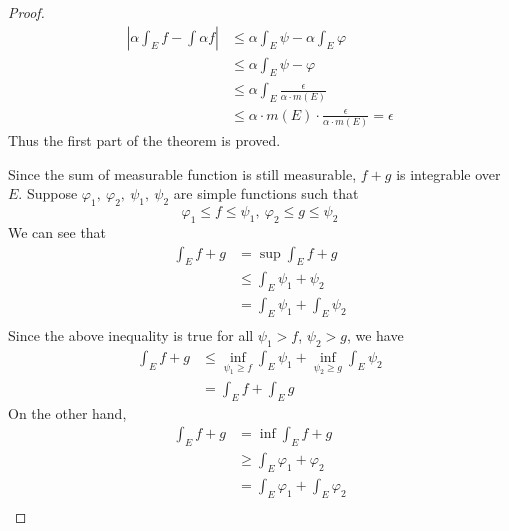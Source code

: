 \documentclass[lang=en, 12pt]{elegantbook}
\begin{document}
\begin{proof}
\begin{equation*}
                \begin{aligned}
                    |\alpha \int_E f - \int \alpha f| &\leq \alpha \int_E \psi - \alpha \int_E \varphi \\
                    &\leq \alpha \int_E \psi - \varphi \\
                    &\leq \alpha \int_E \frac{\epsilon}{\alpha \cdot m(E)}\\
                    &\leq \alpha \cdot m(E) \cdot \frac{\epsilon}{\alpha \cdot m(E)} = \epsilon 
                \end{aligned}
            \end{equation*}
            Thus the first part of the theorem is proved. \par 
                Since the sum of measurable function is still measurable, $f+g$ is integrable over $E$. Suppose 
            $\varphi_1, \ \varphi_2, \ \psi_1, \ \psi_2$ are simple functions such that 
            $$\varphi_1 \leq f \leq \psi_1, \ \varphi_2 \leq g \leq \psi_2$$
            We can see that 
            \begin{equation*}
                \begin{aligned}
                    \int_E f+ g &= \sup \int_E f+g \\
                    &\leq \int_E \psi_1 + \psi_2\\
                    &= \int_E \psi_1 + \int_E \psi_2\\
                \end{aligned}
            \end{equation*}
            Since the above inequality is true for all $\psi_1 > f$, $\psi_2 > g$, we have 
            \begin{equation*}
                \begin{aligned}
                    \int_E f+ g &\leq \inf_{\psi_1 \geq f}\int_E \psi_1 +  \inf_{\psi_2 \geq g}\int_E \psi_2\\
                    &= \int_E f +\int_E g 
                \end{aligned}
            \end{equation*}
            On the other hand, 
            \begin{equation*}
                \begin{aligned}
                    \int_E f+ g &= \inf \int_E f+g \\
                    &\geq \int_E \varphi_1 + \varphi_2\\
                    &= \int_E \varphi_1 + \int_E \varphi_2\\

\end{aligned}
\end{equation*}
\end{proof}
\end{document}
